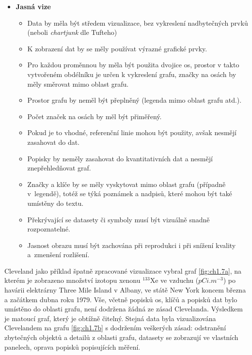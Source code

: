 \documentclass[12pt,]{article}
\providecommand{\tightlist}{%
  \setlength{\itemsep}{0pt}\setlength{\parskip}{0pt}}
\begin{document}
\begin{itemize}
\tightlist
\item
  \textbf{Jasná vize}

  \begin{itemize}
  \tightlist
  \item
    Data by měla být středem vizualizace, bez vykreslení nadbytečných
    prvků (neboli \emph{chartjunk} dle Tufteho)
  \item
    K zobrazení dat by se měly používat výrazné grafické prvky.
  \item
    Pro každou proměnnou by měla být použita dvojice os, prostor v takto
    vytvořeném obdélníku je určen k vykreslení grafu, značky na osách by
    měly směrovat mimo oblast grafu.
  \item
    Prostor grafu by neměl být přeplněný (legenda mimo oblast grafu
    atd.).
  \item
    Počet značek na osách by měl být přiměřený.
  \item
    Pokud je to vhodné, referenční linie mohou být použity, avšak
    nesmějí zasahovat do dat.
  \item
    Popisky by neměly zasahovat do kvantitativních dat a nesmějí
    znepřehledňovat graf.
  \item
    Značky a klíče by se měly vyskytovat mimo oblast grafu (případně
    v~legendě), totéž se týká poznámek a nadpisů, které mohou být také
    umístěny do textu.
  \item
    Překrývající se datasety či symboly musí být vizuálně snadně
    rozpoznatelné.
  \item
    Jasnost obrazu musí být zachována při reprodukci i při snížení
    kvality a~zmenšení rozlišení.
  \end{itemize}
\end{itemize}

Cleveland jako příklad špatně zpracované vizualizace vybral graf
\ref{fig:ch1.7a}, na kterém je zobrazeno množství izotopu xenonu
\({}^{133}\mbox{Xe}\) ve vzduchu (\(pCi.m^{-3}\)) po havárii elektrárny
Three Mile Island v Albany, ve státě New York koncem března a začátkem
dubna roku 1979. Vše, včetně popisků os, klíčů a popisků dat bylo
umístěno do oblasti grafu, není dodržena žádná ze zásad Clevelanda.
Výsledkem je matoucí graf, který je obtížně čitelný. Stejná data byla
vizualizována Clevelandem na grafu \ref{fig:ch1.7b} s dodržením
veškerých zásad: odstranění zbytečných objektů a detailů z oblasti
grafu, datasety se zobrazují ve vlastních panelech, oprava popisků
popisujících měření.
\end{document}
